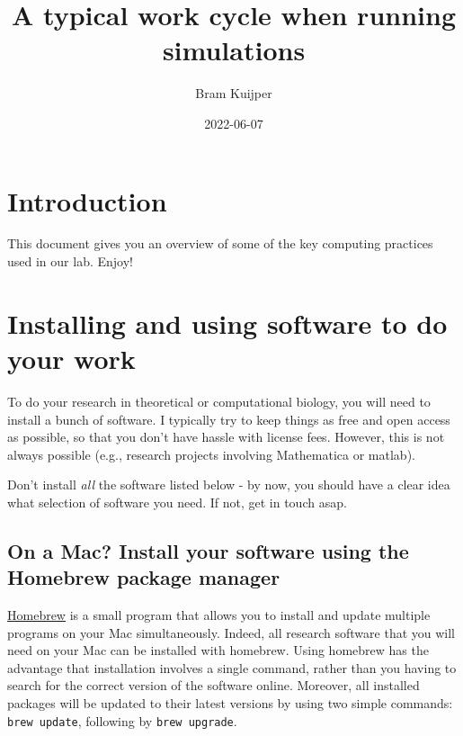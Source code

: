 \documentclass[
]{book}
\title{A typical work cycle when running simulations}
\author{Bram Kuijper}
\date{2022-06-07}
\begin{document}
\maketitle

{
\setcounter{tocdepth}{1}
\tableofcontents
}
\hypertarget{introduction}{%
\chapter{Introduction}\label{introduction}}

This document gives you an overview of some of the key computing practices used in our lab. Enjoy!

\hypertarget{installing-and-using-software-to-do-your-work}{%
\chapter{Installing and using software to do your work}\label{installing-and-using-software-to-do-your-work}}

To do your research in theoretical or computational biology, you will need to install a bunch of software. I typically try to keep things as free and open access as possible, so that you don't have hassle with license fees. However, this is not always possible (e.g., research projects involving Mathematica or matlab).

Don't install \emph{all} the software listed below - by now, you should have a clear idea what selection of software you need. If not, get in touch asap.

\hypertarget{on-a-mac-install-your-software-using-the-homebrew-package-manager}{%
\section{On a Mac? Install your software using the Homebrew package manager}\label{on-a-mac-install-your-software-using-the-homebrew-package-manager}}

\href{https://brew.sh}{Homebrew} is a small program that allows you to install and update multiple programs on your Mac simultaneously. Indeed, all research software that you will need on your Mac can be installed with homebrew. Using homebrew has the advantage that installation involves a single command, rather than you having to search for the correct version of the software online. Moreover, all installed packages will be updated to their latest versions by using two simple commands: \texttt{brew\ update}, following by \texttt{brew\ upgrade}.
\end{document}
